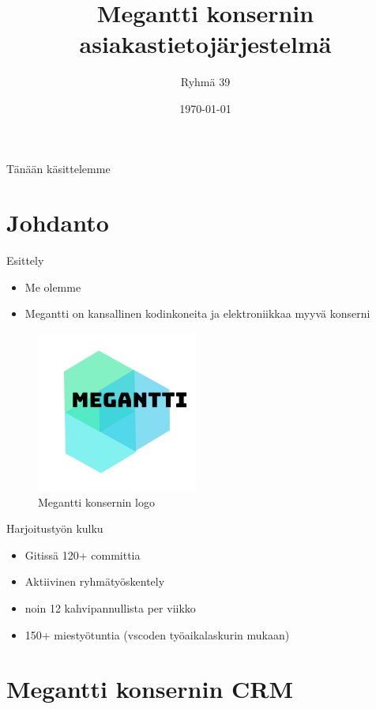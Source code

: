 \documentclass{beamer}
\title[JOTU-2019 Megantti]{Megantti konsernin asiakastietojärjestelmä}
\author{Ryhmä 39}
\institute{Tampereen Teknillinen Yliopisto}
\date{\today}
\begin{document}
\begin{frame}
  \titlepage
\end{frame}

\begin{frame}{Tänään käsittelemme}
	\tableofcontents[pausesections]
\end{frame}

\section{Johdanto}

\begin{frame}{Esittely}
\begin{itemize}
  \item<1-> Me olemme
  \item<2-> Megantti on kansallinen kodinkoneita ja elektroniikkaa myyvä konserni
\end{itemize}

\begin{figure}
\includegraphics[scale=1.0]{../megantti.png}
	\caption{Megantti konsernin logo}
\end{figure}

\end{frame}

\begin{frame}{Harjoitustyön kulku}
	\begin{itemize}
		\item<2-> Gitissä 120+ committia
		\item<3-> Aktiivinen ryhmätyöskentely
		\item<4-> noin 12 kahvipannullista per viikko
		\item<5-> 150+ miestyötuntia (vscoden työaikalaskurin mukaan)
	\end{itemize}
\end{frame}


\section{Megantti konsernin CRM}
\end{document}
